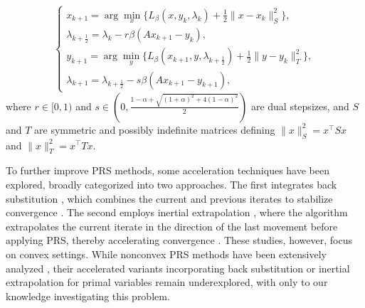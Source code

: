 \documentclass[pdflatex,sn-mathphys-num]{sn-jnl}%
\theoremstyle{thmstyleone}%
\theoremstyle{thmstyletwo}%
\theoremstyle{thmstylethree}%
\begin{document}
\[
\begin{cases}{}
	x_{k+1}=\arg\min\limits_{x} \{L_{\beta}(x,y_k,\lambda_k)+\frac{1}{2}\|x-x_k\|_S^2\},\\
	\lambda_{k+\frac{1}{2}}=\lambda_{k}-r\beta (Ax_{k+1}-y_k),\\
	y_{k+1}=\arg\min\limits_{y} \{L_{\beta}(x_{k+1},y,\lambda_{k+\frac{1}{2}})+\frac{1}{2}\|y-y_k\|_T^2\},\\
	\lambda_{k+1}=\lambda_{k+\frac{1}{2}}-s\beta (Ax_{k+1}-y_{k+1}),
\end{cases}
\]
where $r\in [0,1)$ and $s\in (0,\frac{1-\alpha+\sqrt{(1+\alpha)^2+4(1-\alpha)^2}}{2})$ are dual stepsizes, and $S$ and $T$ are symmetric and possibly indefinite matrices defining $\|x\|_{S}^2={x^{\top}Sx}$ and $\|x\|_{T}^2={x^{\top}Tx}$. 

To further improve PRS methods, some acceleration techniques have been explored, broadly categorized into two approaches. The first integrates back substitution \cite{HTY12}, which combines the current and previous iterates to stabilize convergence \cite{DL19}. The second employs inertial extrapolation \cite{AA01}, where the algorithm extrapolates the current iterate in the direction of the last movement before applying PRS, thereby accelerating convergence \cite{DLL17,DL20}. These studies, however, focus on convex settings.
While nonconvex PRS methods have been extensively analyzed \cite{CDD16,LLP17,GHLILW22,LJH23}, their accelerated variants incorporating back substitution or inertial extrapolation for primal variables remain underexplored, with only \cite{WSL23} to our knowledge investigating this problem.
\end{document}
